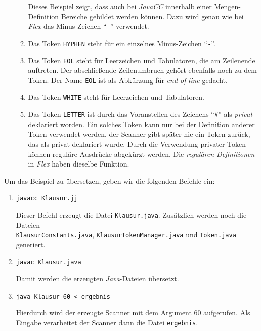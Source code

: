 \begin{enumerate}
\begin{enumerate}
            Dieses Beispiel zeigt, dass auch bei \textsl{JavaCC}\/ innerhalb einer
            Mengen-Definition Bereiche gebildet werden k\"onnen.  Dazu wird genau wie bei 
            \textsl{Flex}\/ das Minus-Zeichen ``\texttt{-}'' verwendet.
      \item Das Token \texttt{HYPHEN} steht f\"ur ein einzelnes Minus-Zeichen ``\texttt{-}''.
      \item Das Token \texttt{EOL} steht f\"ur Leerzeichen und Tabulatoren, die am
            Zeilenende auftreten.  Der abschlie{\ss}ende Zeilenumbruch geh\"ort ebenfalls noch
            zu dem Token.  Der Name \texttt{EOL} ist als Abk\"urzung f\"ur 
            \emph{\underline{e}nd \underline{o}f \underline{l}ine} gedacht.
      \item Das Token \texttt{WHITE} steht f\"ur Leerzeichen und Tabulatoren.
      \item Das Token \texttt{LETTER} ist durch das Voranstellen des
            Zeichens ``\texttt{\#}'' als \emph{privat} deklariert worden.
            Ein solches Token kann nur bei der Definition anderer Token verwendet werden,
            der Scanner gibt sp\"ater nie ein Token zur\"uck, das als privat deklariert
            wurde.  Durch die Verwendung privater Token k\"onnen regul\"are Ausdr\"ucke
            abgek\"urzt werden.  Die \emph{regul\"aren Definitionen} in \textsl{Flex}\/ haben
            dieselbe Funktion.
      \end{enumerate}
\end{enumerate}
Um das Beispiel zu \"ubersetzen, geben wir die folgenden Befehle ein:
\begin{enumerate}
\item \texttt{javacc Klausur.jj}

      Dieser Befehl erzeugt die Datei \texttt{Klausur.java}.  Zus\"atzlich werden noch die
      Dateien  
      \\[0.2cm]
      \hspace*{1.3cm}
      \texttt{KlausurConstants.java}, \texttt{KlausurTokenManager.java} und
      \texttt{Token.java} 
      \\[0.2cm]
      generiert.
\item \texttt{javac Klausur.java}      

      Damit werden die erzeugten \textsl{Java}-Dateien \"ubersetzt.
\item \texttt{java Klausur 60 < ergebnis}

      Hierdurch wird der erzeugte Scanner mit dem Argument 60 aufgerufen.
      Als Eingabe verarbeitet der Scanner dann die Datei \texttt{ergebnis}.
\end{enumerate}

